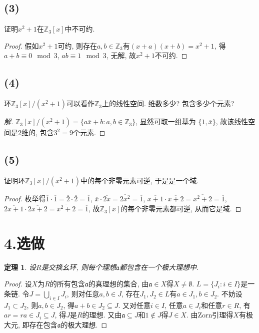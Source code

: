 \documentclass[12pt, a4paper, fontset=windows]{ctexart}
\newcommand{\Z}{\mathbb{Z}}
\newcommand{\cl}[1]{\overline{#1}} %
\newcommand{\xuan}{{\normalsize 选做}}
\newtheorem*{theorem}{定理}
\newenvironment{solution}{\begin{proof}[解]}{\end{proof}}
\begin{document}
\subsection*{(3)}

证明$x^2+1$在$\Z_3[x]$中不可约. 

\begin{proof}
假如$x^2+1$可约, 则存在$a,b\in\Z_3$有$(x+a)(x+b)=x^2+1$, 
得$a+b\equiv 0\mod{3}$, $ab\equiv 1\mod{3}$, 无解, 故$x^2+1$不可约. 
\end{proof}

\subsection*{(4)}

环$\Z_3[x]/(x^2+1)$可以看作$\Z_3$上的线性空间. 维数多少? 包含多少个元素? 

\begin{solution}
$\Z_3[x]/(x^2+1)=\{a\cl{x}+b:a,b\in\Z_3\}$, 显然可取一组基为
$\{1,\cl{x}\}$, 故该线性空间是$2$维的, 包含$3^2=9$个元素. 
\end{solution}

\subsection*{(5)}

证明环$\Z_3[x]/(x^2+1)$中的每个非零元素可逆, 于是是一个域. 

\begin{proof}
枚举得$\cl{1}\cdot\cl{1}=\cl{2}\cdot\cl{2}=\cl{1}$, 
$\cl{x}\cdot\cl{2x}=\cl{2x^2}=\cl{1}$, 
$\cl{x+1}\cdot\cl{x+2}=\cl{x^2+2}=\cl{1}$, 
$\cl{2x+1}\cdot\cl{2x+2}=\cl{x^2+2}=\cl{1}$, 
故$\Z_3[x]$的每个非零元素都可逆, 从而它是域. 
\end{proof}

\section*{4.\xuan}
{
\def\a{\mathfrak{a}}
\begin{theorem}
设$R$是交换幺环, 则每个理想$\a$都包含在一个极大理想中. 
\end{theorem}

\begin{proof}
设$X$为$R$的所有包含$\a$的真理想的集合, 由$\a\in X$得$X\ne\emptyset$. $L=\{J_i:i\in I\}$是一条链. 
令$J=\bigcup_{i\in I}J_i$, 则对任意$a,b\in J$, 
存在$J_1,J_2\in L$有$a\in J_1,b\in J_2$. 不妨设$J_1\subset J_2$, 
则$a,b\in J_2$, 得$a+b\in J_2\subseteq J$. 
又对任意$i\in I$, 任意$a\in J_i$和任意$r\in R$, 
有$ar=ra\in J_i\subseteq J$, 得$J$是$R$的理想. 
又由$\a\subseteq J$和$1\notin J$得$J\in X$. 
由Zorn引理得$X$有极大元, 即存在包含$\a$的极大理想. 
\end{proof}
}
\end{document}
